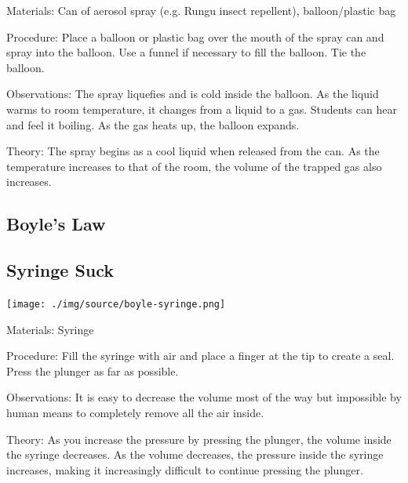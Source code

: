 \begin{multicols}{2}
\begin{description*}
\item[Materials:]{Can of aerosol spray (e.g. Rungu insect repellent), balloon/plastic bag}
\item[Procedure:]{Place a balloon or plastic bag over the mouth of the spray can and spray into the balloon. Use a funnel if necessary to fill the balloon. Tie the balloon.}
\item[Observations:]{The spray liquefies and is cold inside the balloon. As the liquid warms to room temperature, it changes from a liquid to a gas. Students can hear and feel it boiling. As the gas heats up, the balloon expands.}
\item[Theory:]{The spray begins as a cool liquid when released from the can. As the temperature increases to that of the room, the volume of the trapped gas also increases.}
\end{description*}

\subsection*{Boyle's Law}

\subsection{Syringe Suck}

\begin{center}
\texttt{[image: ./img/source/boyle-syringe.png]}
\end{center}

\begin{description*}
\item[Materials:]{Syringe}
\item[Procedure:]{Fill the syringe with air and place a finger at the tip to create a seal. Press the plunger as far as possible.}
\item[Observations:]{It is easy to decrease the volume most of the way but impossible by human means to completely remove all the air inside.}
\item[Theory:]{As you increase the pressure by pressing the plunger, the volume inside the syringe decreases. As the volume decreases, the pressure inside the syringe increases, making it increasingly difficult to continue pressing the plunger.}
\end{description*}


\end{multicols}

